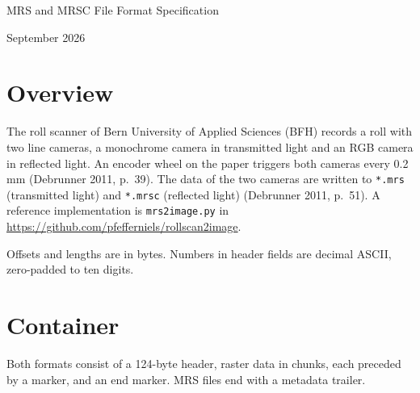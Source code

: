 \documentclass[11pt, a4paper]{article}
\newcommand{\code}[1]{\texttt{#1}}
\newcommand{\debrunner}[1]{(Debrunner 2011, p.~#1)}
\newenvironment{block}
  {\par\medskip\noindent\begin{minipage}{\textwidth}\centering}
  {\end{minipage}\par\medskip}
\begin{document}
\begin{center}
{\LARGE MRS and MRSC File Format Specification\par}
 September 2026
\end{center}

\section{Overview}

The roll scanner of Bern University of Applied Sciences (BFH) records a roll with two line cameras, a monochrome camera in transmitted light and an RGB camera in reflected light.
An encoder wheel on the paper triggers both cameras every 0.2\,mm \debrunner{39}.
The data of the two cameras are written to \code{*.mrs} (transmitted light) and \code{*.mrsc} (reflected light) \debrunner{51}.
A reference implementation is \code{mrs2image.py} in \url{https://github.com/pfefferniels/rollscan2image}.

Offsets and lengths are in bytes. Numbers in header fields are decimal ASCII, zero-padded to ten digits.

\section{Container}

Both formats consist of a 124-byte header, raster data in chunks, each preceded by a marker, and an end marker.
MRS files end with a metadata trailer.

\begin{block}
\newcommand{\segment}[4][white]{%
  \filldraw[fill=#1] (#2,0) rectangle ++(#3,9);
  \node[align=center] at ({#2+#3/2},4.5) {#4};}
\label{fig:container}
\end{block}
\end{document}
